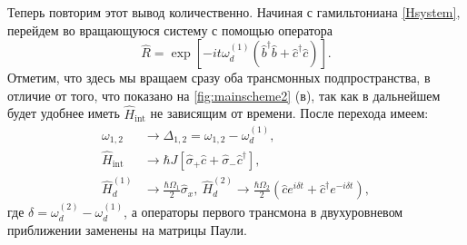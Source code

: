 \documentclass[14pt, a4paper]{extreport}
\numberwithin{equation}{section}
\begin{document}
Теперь повторим этот вывод количественно. Начиная с гамильтониана \eqref{Hsystem}, перейдем во вращающуюся систему с помощью оператора
\begin{equation}
\hat R = \exp [-it \omega_d^{(1)}(\hat b^\dag \hat b + \hat c^\dag \hat c)].
\end{equation}
Отметим, что здесь мы вращаем сразу оба трансмонных подпространства, в отличие от того, что показано на \autoref{fig:mainscheme2} (в), так как в дальнейшем будет удобнее иметь $\hat H_\text{int}$ не зависящим от времени. После перехода имеем:
\begin{equation}
\begin{aligned}
\omega_{1,2} &\rightarrow \Delta_{1,2} = \omega_{1,2} - \omega_d^{(1)},\\
\hat H_\text{int} &\rightarrow  \hbar J \left[\hat \sigma_+ \hat c + \hat \sigma_-\hat c^\dag \right],\\
\hat H_{d}^{(1)} &\rightarrow \frac{\hbar \Omega_1}{2} \hat \sigma_x,\ 
\hat H_{d}^{(2)} \rightarrow \frac{\hbar \Omega_2}{2}(\hat c e^{i\delta t}  + \hat c^\dag e^{-i\delta t}),
\end{aligned}
\end{equation}
где $\delta = \omega_{d}^{(2)} - \omega_{d}^{(1)}$, а операторы первого трансмона в двухуровневом приближении заменены на матрицы Паули.
\end{document}

